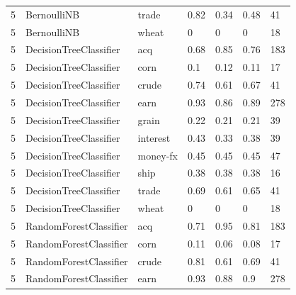 \documentclass{article}
\begin{document}
\begin{table}[h]
\begin{tabular}{lllllll}
5             & BernoulliNB            & trade           & 0.82               & 0.34            & 0.48              & 41               \\
5             & BernoulliNB            & wheat           & 0                  & 0               & 0                 & 18               \\
5             & DecisionTreeClassifier & acq             & 0.68               & 0.85            & 0.76              & 183              \\
5             & DecisionTreeClassifier & corn            & 0.1                & 0.12            & 0.11              & 17               \\
5             & DecisionTreeClassifier & crude           & 0.74               & 0.61            & 0.67              & 41               \\
5             & DecisionTreeClassifier & earn            & 0.93               & 0.86            & 0.89              & 278              \\
5             & DecisionTreeClassifier & grain           & 0.22               & 0.21            & 0.21              & 39               \\
5             & DecisionTreeClassifier & interest        & 0.43               & 0.33            & 0.38              & 39               \\
5             & DecisionTreeClassifier & money-fx        & 0.45               & 0.45            & 0.45              & 47               \\
5             & DecisionTreeClassifier & ship            & 0.38               & 0.38            & 0.38              & 16               \\
5             & DecisionTreeClassifier & trade           & 0.69               & 0.61            & 0.65              & 41               \\
5             & DecisionTreeClassifier & wheat           & 0                  & 0               & 0                 & 18               \\
5             & RandomForestClassifier & acq             & 0.71               & 0.95            & 0.81              & 183              \\
5             & RandomForestClassifier & corn            & 0.11               & 0.06            & 0.08              & 17               \\
5             & RandomForestClassifier & crude           & 0.81               & 0.61            & 0.69              & 41               \\
5             & RandomForestClassifier & earn            & 0.93               & 0.88            & 0.9               & 278              \\\end{tabular}
\end{table}
\end{document}
